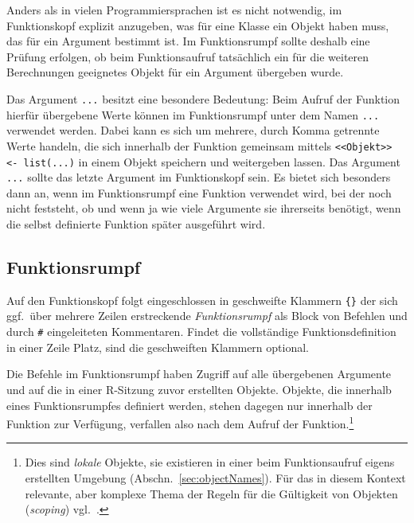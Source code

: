 Anders als in vielen Programmiersprachen ist es nicht notwendig, im Funktionskopf explizit anzugeben, was für eine Klasse ein Objekt haben muss, das für ein Argument bestimmt ist. Im Funktionsrumpf sollte deshalb eine Prüfung erfolgen, ob beim Funktionsaufruf tatsächlich ein für die weiteren Berechnungen geeignetes Objekt für ein Argument übergeben wurde.

Das Argument \lstinline!...! besitzt eine besondere Bedeutung: Beim Aufruf der Funktion hierfür übergebene Werte können im Funktionsrumpf unter dem Namen \lstinline!...! verwendet werden. Dabei kann es sich um mehrere, durch Komma getrennte Werte handeln, die sich innerhalb der Funktion gemeinsam mittels \lstinline!<<Objekt>> <- list(...)! in einem Objekt speichern und weitergeben lassen. Das Argument \lstinline!...! sollte das letzte Argument im Funktionskopf sein. Es bietet sich besonders dann an, wenn im Funktionsrumpf eine Funktion verwendet wird, bei der noch nicht feststeht, ob und wenn ja wie viele Argumente sie ihrerseits benötigt, wenn die selbst definierte Funktion später ausgeführt wird.

\subsection{Funktionsrumpf}
\label{sec:funcBody}

Auf den Funktionskopf folgt eingeschlossen in geschweifte Klammern \lstinline!{}! der sich ggf.\ über mehrere Zeilen erstreckende \emph{Funktionsrumpf} als Block von Befehlen und durch \lstinline!#! eingeleiteten Kommentaren. Findet die vollständige Funktionsdefinition in einer Zeile Platz, sind die geschweiften Klammern optional.

Die Befehle im Funktionsrumpf haben Zugriff auf alle übergebenen Argumente und auf die in einer R-Sitzung zuvor erstellten Objekte. Objekte, die innerhalb eines Funktionsrumpfes definiert werden, stehen dagegen nur innerhalb der Funktion zur Verfügung, verfallen also nach dem Aufruf der Funktion.\footnote{Dies sind \emph{lokale} Objekte, sie existieren in einer beim Funktionsaufruf eigens erstellten Umgebung (Abschn.\ \ref{sec:objectNames}). Für das in diesem Kontext relevante, aber komplexe Thema der Regeln für die Gültigkeit von Objekten (\emph{scoping}) vgl.\ .}

